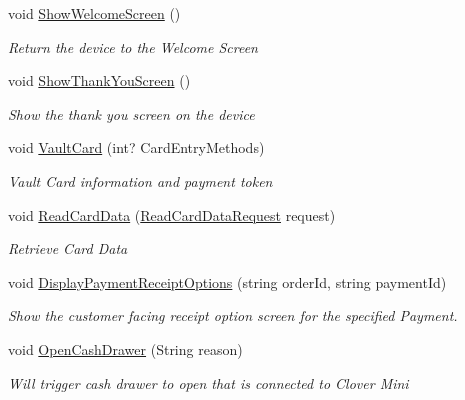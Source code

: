 \begin{DoxyCompactItemize}
void \hyperlink{classcom_1_1clover_1_1remotepay_1_1sdk_1_1_clover_connector_a33c344737b54ed6d8c910e2ac1e5bd49}{Show\+Welcome\+Screen} ()
\begin{DoxyCompactList}\small\item\em Return the device to the Welcome Screen \end{DoxyCompactList}\item 
void \hyperlink{classcom_1_1clover_1_1remotepay_1_1sdk_1_1_clover_connector_a14b5524c67d9b52c57cd2e972a65d7f1}{Show\+Thank\+You\+Screen} ()
\begin{DoxyCompactList}\small\item\em Show the thank you screen on the device \end{DoxyCompactList}\item 
void \hyperlink{classcom_1_1clover_1_1remotepay_1_1sdk_1_1_clover_connector_a26e95230422276f47542882628b5038f}{Vault\+Card} (int? Card\+Entry\+Methods)
\begin{DoxyCompactList}\small\item\em Vault Card information and payment token \end{DoxyCompactList}\item 
void \hyperlink{classcom_1_1clover_1_1remotepay_1_1sdk_1_1_clover_connector_a0901566c92bbce70865b3ae144e42cdc}{Read\+Card\+Data} (\hyperlink{classcom_1_1clover_1_1remotepay_1_1sdk_1_1_read_card_data_request}{Read\+Card\+Data\+Request} request)
\begin{DoxyCompactList}\small\item\em Retrieve Card Data \end{DoxyCompactList}\item 
void \hyperlink{classcom_1_1clover_1_1remotepay_1_1sdk_1_1_clover_connector_a3c71f60836d40aa51b70841f7be6cf30}{Display\+Payment\+Receipt\+Options} (string order\+Id, string payment\+Id)
\begin{DoxyCompactList}\small\item\em Show the customer facing receipt option screen for the specified Payment. \end{DoxyCompactList}\item 
void \hyperlink{classcom_1_1clover_1_1remotepay_1_1sdk_1_1_clover_connector_aeeba2f27e901c6f105dbd9cdc624bd2c}{Open\+Cash\+Drawer} (String reason)
\begin{DoxyCompactList}\small\item\em Will trigger cash drawer to open that is connected to Clover Mini \end{DoxyCompactList}\item 

\end{DoxyCompactItemize}

